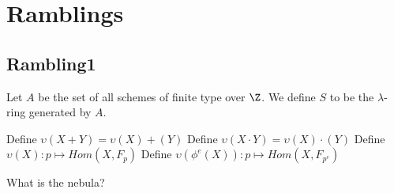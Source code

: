 
\section{Ramblings}

\subsection{Rambling1}

Let $A$ be the set of all schemes of finite type over $\Z$. We define $S$ to be the $\lambda$-ring generated by $A$. 

Define $\upsilon(X + Y) = \upsilon(X) + (Y)$
Define $\upsilon(X \cdot Y) = \upsilon(X) \cdot (Y)$
Define $\upsilon(X) : p \mapsto Hom(X, F_p)$
Define $\upsilon(\phi^e(X)) : p \mapsto Hom(X, F_{p^e})$

What is the nebula?
